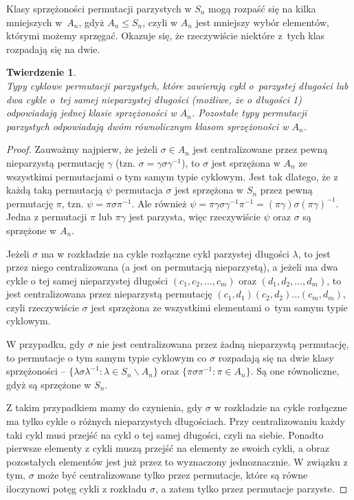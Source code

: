\documentclass[licencjacka]{pracamgr}
\newtheorem{thh}{Twierdzenie}[section]
\begin{document}
Klasy sprzężoności permutacji parzystych w $S_n$ mogą rozpaść się
na kilka mniejszych w~$A_n$, gdyż $A_n \le S_n$, czyli w $A_n$ jest
mniejszy wybór elementów, którymi możemy sprzęgać. Okazuje się, że
rzeczywiście niektóre z~tych klas rozpadają się na dwie.

\begin{thh}\label{thm_o_klasach_A_n} $ $ \\
    Typy cyklowe permutacji parzystych, które zawierają cykl o~parzystej długości
    lub dwa cykle o~tej samej nieparzystej długości (możliwe, że o długości 1)
    odpowiadają jednej klasie sprzężoności w $A_n$.
    Pozostałe typy permutacji parzystych odpowiadają dwóm równolicznym klasom sprzężoności w $A_n$.
\end{thh}
\begin{proof}
    Zauważmy najpierw, że jeżeli $\sigma \in A_n$ jest centralizowane przez pewną nieparzystą permutację $\gamma$
    (tzn. $\sigma = \gamma \sigma \gamma ^{-1}$),
    to $\sigma$ jest sprzężona w $A_n$ ze wszystkimi permutacjami o tym samym typie cyklowym.
    Jest tak dlatego, że z każdą taką permutacją $\psi$ permutacja $\sigma$ jest sprzężona w $S_n$ przez pewną permutację $\pi$,
    tzn. $\psi = \pi \sigma \pi^{-1}$.
    Ale również $\psi = \pi \gamma \sigma \gamma^{-1} \pi^{-1} = (\pi \gamma) \sigma (\pi \gamma)^{-1}$.
    Jedna z permutacji $\pi$ lub $\pi \gamma$ jest parzysta, więc rzeczywiście $\psi$ oraz $\sigma$ są sprzężone w $A_n$.

    Jeżeli $\sigma$ ma w rozkładzie na cykle rozłączne cykl parzystej długości $\lambda$,
    to jest przez niego centralizowana (a jest on permutacją nieparzystą),
    a jeżeli ma dwa cykle o tej samej nieparzystej długości $(c_1, c_2, \ldots, c_m)$ oraz $(d_1, d_2, \ldots, d_m)$,
    to jest centralizowana przez nieparzystą permutację $(c_1, d_1)(c_2, d_2) \ldots (c_m, d_m)$,
    czyli rzeczywiście $\sigma$ jest sprzężona ze wszystkimi elementami o~tym samym typie cyklowym.

    W przypadku, gdy $\sigma$ nie jest centralizowana przez żadną nieparzystą permutację,
    to permutacje o tym samym typie cyklowym co $\sigma$ rozpadają się na dwie klasy sprzężoności --
    $\{\lambda \sigma \lambda^{-1} \colon \lambda \in S_n \backslash A_n \}$ oraz
    $\{\pi \sigma \pi^{-1} \colon \pi \in  A_n \}$.
    Są one równoliczne, gdyż są sprzężone w $S_n$.

    Z takim przypadkiem mamy do czynienia, gdy $\sigma$ w rozkładzie na cykle rozłączne
    ma tylko cykle o różnych nieparzystych długościach.
    Przy centralizowaniu każdy taki cykl musi przejść na cykl o tej samej długości, czyli na siebie.
    Ponadto pierwsze elementy z cykli muszą przejść na elementy ze swoich cykli,
    a obraz pozostałych elementów jest już przez to wyznaczony jednoznacznie.
    W związku z tym, $\sigma$ może być centralizowane tylko przez permutacje,
    które są równe iloczynowi potęg cykli z rozkładu $\sigma$,
    a zatem tylko przez permutacje parzyste.
\end{proof}
\end{document}
